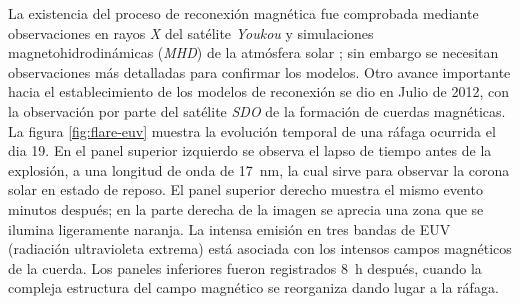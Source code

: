 La existencia del proceso de reconexión magnética fue comprobada mediante observaciones en rayos \emph{X} del satélite \emph{Youkou} \cite{masuda,tsuneta} y simulaciones magnetohidrodinámicas (\emph{MHD}) de la atmósfera solar  \cite{yokoyama}; sin embargo se necesitan observaciones más detalladas para confirmar los modelos. Otro avance importante hacia el establecimiento de los modelos de reconexión se dio en Julio de \num{2012}, con la observación por parte del satélite \emph{SDO} de la formación de cuerdas magnéticas. La figura \ref{fig:flare-euv} muestra la evolución temporal de una ráfaga ocurrida el dia \num{19}. En el panel superior izquierdo se observa el lapso de tiempo antes de la explosión, a una longitud de onda de \SI{17}{\nano\metre}, la cual sirve para observar la corona solar en estado de reposo. El panel superior derecho muestra el mismo evento minutos después; en la parte derecha de la imagen se aprecia una zona que se ilumina ligeramente naranja. La intensa emisión en tres bandas de EUV (radiación ultravioleta extrema) está asociada con los intensos campos magnéticos de la cuerda. Los paneles inferiores fueron registrados \SI{8}{\hour} después, cuando la compleja estructura del campo magnético se reorganiza dando lugar a la ráfaga.

